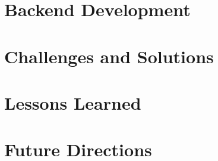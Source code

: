 \section{Backend Development}
\label{sec:system:backend}


\section{Challenges and Solutions}
\label{sec:system:challenges}


\section{Lessons Learned}
\label{sec:system:lessons}

\section{Future Directions}
\label{sec:system:future}
